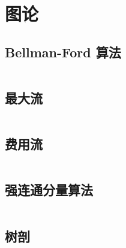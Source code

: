 \section{图论}

\subsection{Bellman-Ford 算法}

\inputminted{cpp}{icpc/graph/shortest_path/bf.cpp}

\subsection{最大流}

\inputminted{cpp}{icpc/graph/maxflow/maxflow.cpp}

\subsection{费用流}

\inputminted{cpp}{icpc/graph/SSP/SSP.cpp}

\subsection{强连通分量算法}

\inputminted{cpp}{icpc/graph/scc/scc.cpp}

\subsection{树剖}

\inputminted{cpp}{icpc/graph/splittree/splittree.cpp}
